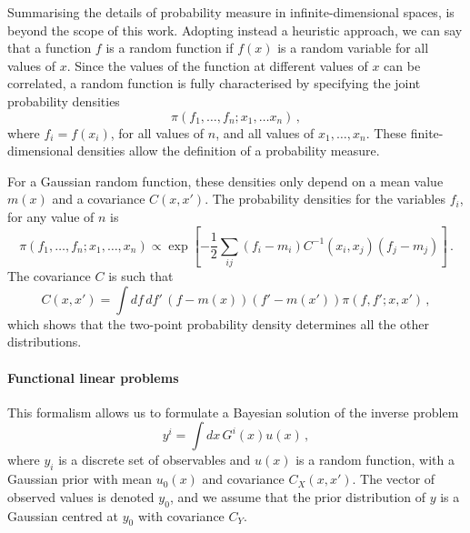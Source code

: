 Summarising the details of probability measure in infinite-dimensional spaces,
is beyond the scope of this work. Adopting instead a heuristic approach, we can
say that a function $f$ is a random function if $f(x)$ is a random variable for
all values of $x$. Since the values of the function at different values of $x$
can be correlated, a random function is fully characterised by specifying the
joint probability densities
\begin{equation}
  \label{eq:RandomFuncJointProb}
  \pi\left(
    f_1, \ldots, f_n; x_1, \ldots x_n
  \right)\, ,
\end{equation}
where $f_i=f(x_i)$, for all values of $n$, and all values of $x_1, \ldots, x_n$.
These finite-dimensional densities allow the definition of a probability
measure. 

For a Gaussian random function, these densities only depend on a mean value $m(x)$ 
and a covariance $C(x,x')$. The probability densities for the variables $f_i$, for
any value of $n$ is 
\begin{equation}
  \label{eq:GaussianFunctC}
  \pi\left(f_1, \ldots, f_n; x_1, \ldots, x_n\right)
  \propto \exp \left[ 
      -\frac12 \sum_{ij} \left(f_i - m_i\right) C^{-1}(x_i,x_j) \left(f_j - m_j\right)
    \right]\, .
\end{equation} 
The covariance $C$ is such that
\begin{equation}
  \label{eq:CovFunctInt}
  C(x,x') = \int df\, df'\, \left(f - m(x)\right) \left(f'-m(x')\right)
    \pi\left(f,f';x,x'\right)\,,
\end{equation}
which shows that the two-point probability density determines all the other distributions. 

\paragraph{Functional linear problems} This formalism allows us to formulate a Bayesian 
solution of the inverse problem 
\begin{equation}
  \label{eq:BayesLinearInverse}
  y^i = \int dx\, G^i(x) u(x)\, ,
\end{equation}
where $y_i$ is a discrete set of observables and $u(x)$ is a random function,
with a Gaussian prior with mean $u_0(x)$ and covariance $C_{X}(x,x')$. 
The vector of observed values is denoted $y_0$, and we assume that the prior
distribution of $y$ is a Gaussian centred at $y_0$ with covariance $C_{Y}$.

